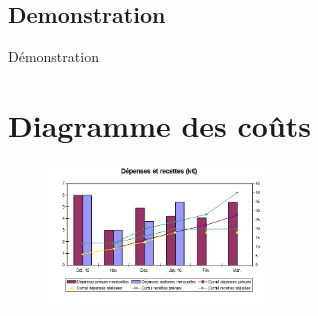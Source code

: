 \documentclass{beamer}
\begin{document}
	
	\subsection{Demonstration}
	\begin{frame}{\subsecname}
		Démonstration
	\end{frame}
	

\section{Diagramme des coûts}

\begin{frame}{\secname}
	\begin{figure}
		\includegraphics[height=3.8cm]{Images/CourbeCout.png}
	\end{figure}
\end{frame}



\end{document}

